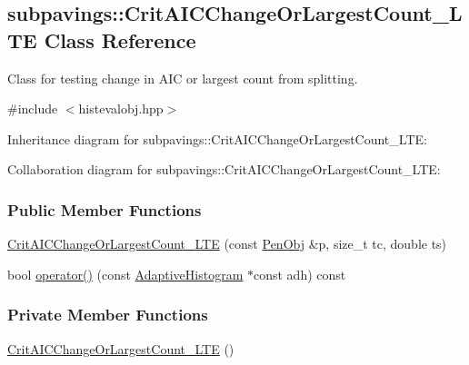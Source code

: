 \hypertarget{classsubpavings_1_1CritAICChangeOrLargestCount__LTE}{\subsection{subpavings\-:\-:\-Crit\-A\-I\-C\-Change\-Or\-Largest\-Count\-\_\-\-L\-T\-E \-Class \-Reference}
\label{classsubpavings_1_1CritAICChangeOrLargestCount__LTE}
}


\-Class for testing change in \-A\-I\-C or largest count from splitting.  




{\ttfamily \#include $<$histevalobj.\-hpp$>$}



\-Inheritance diagram for subpavings\-:\-:\-Crit\-A\-I\-C\-Change\-Or\-Largest\-Count\-\_\-\-L\-T\-E\-:


\-Collaboration diagram for subpavings\-:\-:\-Crit\-A\-I\-C\-Change\-Or\-Largest\-Count\-\_\-\-L\-T\-E\-:
\subsubsection*{\-Public \-Member \-Functions}
\begin{DoxyCompactItemize}
\item 
\hyperlink{classsubpavings_1_1CritAICChangeOrLargestCount__LTE_a0772f75c17cb07e69037a479b4286f2d}{\-Crit\-A\-I\-C\-Change\-Or\-Largest\-Count\-\_\-\-L\-T\-E} (const \hyperlink{classsubpavings_1_1PenObj}{\-Pen\-Obj} \&p, size\-\_\-t tc, double ts)
\item 
bool \hyperlink{classsubpavings_1_1CritAICChangeOrLargestCount__LTE_acf02a98ad7e8268ba30b38d4b15c45e7}{operator()} (const \hyperlink{classsubpavings_1_1AdaptiveHistogram}{\-Adaptive\-Histogram} $\ast$const adh) const 
\end{DoxyCompactItemize}
\subsubsection*{\-Private \-Member \-Functions}
\begin{DoxyCompactItemize}
\item 
\hyperlink{classsubpavings_1_1CritAICChangeOrLargestCount__LTE_abbc1aa34de5d77b71421662f98e2f628}{\-Crit\-A\-I\-C\-Change\-Or\-Largest\-Count\-\_\-\-L\-T\-E} ()
\end{DoxyCompactItemize}
